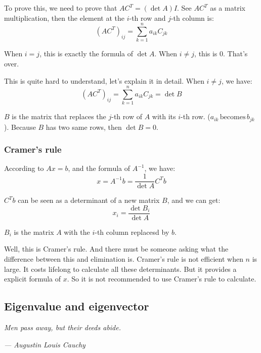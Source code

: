 \documentclass[12pt]{ctexart}
\begin{document}
To prove this, we need to prove that $AC^{T} = (\det A)I$. See $AC^{T}$ as a matrix
multiplication, then the element at the $i$-th row and $j$-th column is:
\[
  (AC^{T})_{ij} = \sum_{k=1}^{n} a_{ik}C_{jk}
\]

When $i = j$, this is exactly the formula of $\det A$. When $i \neq j$, this is 0. That's
over.

This is quite hard to understand, let's explain it in detail. When $i \neq j$, we have:
\[
  (AC^{T})_{ij} = \sum_{k=1}^{n} a_{ik}C_{jk} =
  \det B
\]

$B$ is the matrix that replaces the $j$-th row of $A$ with its $i$-th row. ($a_{ik} \,
\text{becomes} \, b_{jk}$). Because $B$ has two same rows, then $\det B = 0$.

\subsubsection{\textbf{Cramer's rule}}

According to $Ax = b$, and the formula of $A^{-1}$, we have:
\[
  x = A^{-1}b = \frac{1}{\det A} C^{T}b
\]

$C^{T}b$ can be seen as a determinant of a new matrix $B$, and we can get:
\[
  x_i = \frac{\det B_i}{\det A}
\]

$B_i$ is the matrix $A$ with the $i$-th column replacesd by $b$.

Well, this is Cramer's rule. And there must be someone asking what the difference
between this and elimination is. Cramer's rule is not efficient when $n$ is large. It
costs lifelong to calculate all these determinants. But it provides a explicit formula of
$x$. So it is not recommended to use Cramer's rule to calculate.

\newpage
\thispagestyle{empty}
\begin{center}
    \vspace*{96pt}
    \fontsize{60}{60}\par
    \fontsize{26}{31.2}\section{\textbf{Eigenvalue and eigenvector}}\par %
    \vspace{25pt}
    \begin{center}
      \fontsize{18}{21.6}\customfont\textit{Men pass away, but their deeds abide.}
    \end{center}
    \begin{flushright}
      \fontsize{18}{21.6}\customfont\textit{--- Augustin Louis Cauchy}
    \end{flushright}
    \vfill
\end{center}
\end{document}
